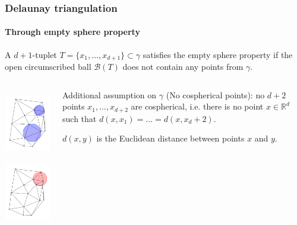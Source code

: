 \documentclass[c, 10pt]{beamer}
\begin{document}
\begin{frame}\frametitle{Delaunay triangulation}\framesubtitle{Through empty sphere property}
\begin{small}

A $d+1$-tuplet $T=\{x_1, \dots, x_{d+1}\} \subset \gamma$ satisfies the \alert{empty sphere property} if the open circumscribed ball $\mathcal B(T)$ does not contain any points from $\gamma$. 
\begin{minipage}[0.2\textheight]{\textwidth}
\begin{columns}[T]
\begin{column}{0.4\textwidth}
\begin{center}
\includegraphics[height = 3cm]{./FigureLayout/DelaunayGood.png}
\includegraphics[height = 3cm]{./FigureLayout/DelaunayBad.png}
\end{center}
\end{column}
\begin{column}{0.6\textwidth}
\vspace{10mm}

Additional assumption on $\gamma$ (\alert{No cospherical points}): no $d+2$ points $x_1, \dots, x_{d+2}$ are cospherical, i.e. there is no point $x\in \mathbb R^d$ such that $d(x,x_1)=\dots =d(x,x_d+2)$.\newline

$d(x,y)$ is the Euclidean distance between points $x$ and $y$.
\end{column}
\end{columns}
\end{minipage}
\vspace{3mm}

\end{small}
\end{frame}
\end{document}
